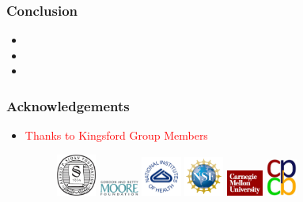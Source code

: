 \documentclass[12pt]{beamer}
\begin{document}




\begin{frame}
\frametitle{Conclusion}

\begin{itemize}
\item 
\vspace{0.1cm}
\item
\vspace{0.1cm}
\item
\end{itemize}

\end{frame}


\begin{frame}
\frametitle{Acknowledgements}

\vspace{0.8cm}

\begin{itemize}
\item\textcolor{red}{Thanks to Kingsford Group Members}

\vfill

\begin{figure}
\includegraphics[width=1.3cm]{sloan.jpg} 
\hfill
\includegraphics[width=1.3cm]{moorelogo.png} 
\hfill
\includegraphics[width=1.3cm]{nih.png}
\hfill
\includegraphics[width=1.3cm]{nsf.png}
\hfill
\includegraphics[width=1.2cm]{cmulogo.jpeg} 
\hfill
\includegraphics[width=1.0cm]{cpcblogo.jpeg}
\end{figure}
\vfill

\end{itemize}

\end{frame}
\end{document}
